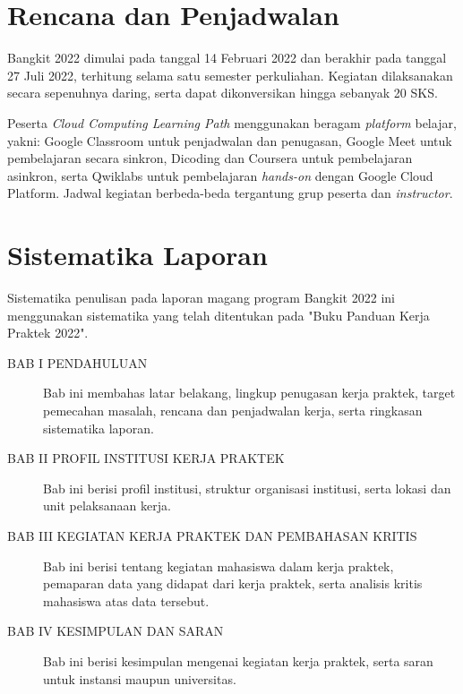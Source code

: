 \section{Rencana dan Penjadwalan}
Bangkit 2022 dimulai pada tanggal 14 Februari 2022 dan berakhir pada tanggal 27 Juli 2022, terhitung selama satu semester perkuliahan. Kegiatan dilaksanakan secara sepenuhnya daring, serta dapat dikonversikan hingga sebanyak 20 SKS.

Peserta \textit{Cloud Computing Learning Path} menggunakan beragam \textit{platform} belajar, yakni: Google Classroom untuk penjadwalan dan penugasan, Google Meet untuk pembelajaran secara sinkron, Dicoding dan Coursera untuk pembelajaran asinkron, serta Qwiklabs untuk pembelajaran \textit{hands-on} dengan Google Cloud Platform. Jadwal kegiatan berbeda-beda tergantung grup peserta dan \textit{instructor}.

\section{Sistematika Laporan}
Sistematika penulisan pada laporan magang program Bangkit 2022 ini menggunakan sistematika yang telah ditentukan pada "Buku Panduan Kerja Praktek 2022".
\begin{description}
	\item[BAB I PENDAHULUAN] Bab ini membahas latar belakang, lingkup penugasan kerja praktek, target pemecahan masalah, rencana dan penjadwalan kerja, serta ringkasan sistematika laporan.
	\item[BAB II PROFIL INSTITUSI KERJA PRAKTEK] Bab ini berisi profil institusi, struktur organisasi institusi, serta lokasi dan unit pelaksanaan kerja.
	\item[BAB III KEGIATAN KERJA PRAKTEK DAN PEMBAHASAN KRITIS] Bab ini berisi tentang kegiatan mahasiswa dalam kerja praktek, pemaparan data yang didapat dari kerja praktek, serta analisis kritis mahasiswa atas data tersebut.
	\item[BAB IV KESIMPULAN DAN SARAN] Bab ini berisi kesimpulan mengenai kegiatan kerja praktek, serta saran untuk instansi maupun universitas.
\end{description}